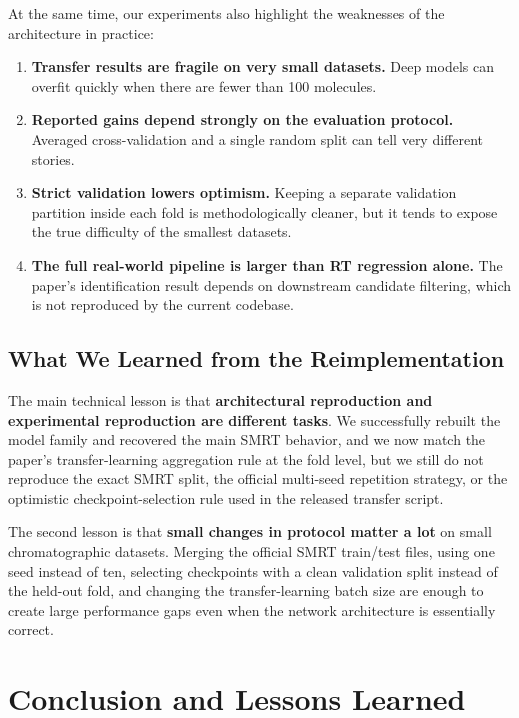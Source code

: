 At the same time, our experiments also highlight the weaknesses of the architecture in practice:

\begin{enumerate}
    \item \textbf{Transfer results are fragile on very small datasets.} Deep models can overfit quickly when there are fewer than 100 molecules.
    \item \textbf{Reported gains depend strongly on the evaluation protocol.} Averaged cross-validation and a single random split can tell very different stories.
    \item \textbf{Strict validation lowers optimism.} Keeping a separate validation partition inside each fold is methodologically cleaner, but it tends to expose the true difficulty of the smallest datasets.
    \item \textbf{The full real-world pipeline is larger than RT regression alone.} The paper's identification result depends on downstream candidate filtering, which is not reproduced by the current codebase.
\end{enumerate}

\subsection{What We Learned from the Reimplementation}

The main technical lesson is that \textbf{architectural reproduction and experimental reproduction are different tasks}. We successfully rebuilt the model family and recovered the main SMRT behavior, and we now match the paper's transfer-learning aggregation rule at the fold level, but we still do not reproduce the exact SMRT split, the official multi-seed repetition strategy, or the optimistic checkpoint-selection rule used in the released transfer script.

The second lesson is that \textbf{small changes in protocol matter a lot} on small chromatographic datasets. Merging the official SMRT train/test files, using one seed instead of ten, selecting checkpoints with a clean validation split instead of the held-out fold, and changing the transfer-learning batch size are enough to create large performance gaps even when the network architecture is essentially correct.

\section{Conclusion and Lessons Learned}


